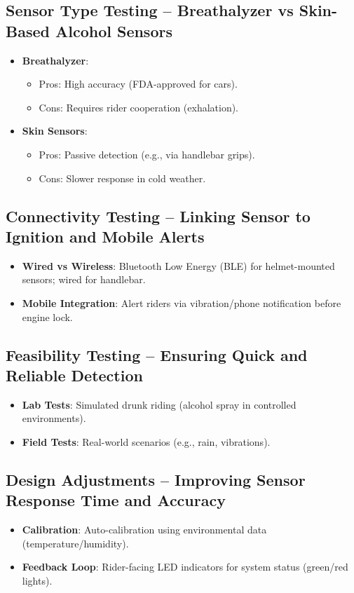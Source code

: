 \documentclass{article}
\begin{document}
\subsection{Sensor Type Testing -- Breathalyzer vs Skin-Based Alcohol Sensors}
\begin{itemize}
    \item \textbf{Breathalyzer}: 
    \begin{itemize}
        \item Pros: High accuracy (FDA-approved for cars).
        \item Cons: Requires rider cooperation (exhalation).
    \end{itemize}
    \item \textbf{Skin Sensors}: 
    \begin{itemize}
        \item Pros: Passive detection (e.g., via handlebar grips).
        \item Cons: Slower response in cold weather.
    \end{itemize}
\end{itemize}

\subsection{Connectivity Testing -- Linking Sensor to Ignition and Mobile Alerts}
\begin{itemize}
    \item \textbf{Wired vs Wireless}: Bluetooth Low Energy (BLE) for helmet-mounted sensors; wired for handlebar.
    \item \textbf{Mobile Integration}: Alert riders via vibration/phone notification before engine lock.
\end{itemize}

\subsection{Feasibility Testing -- Ensuring Quick and Reliable Detection}
\begin{itemize}
    \item \textbf{Lab Tests}: Simulated drunk riding (alcohol spray in controlled environments).
    \item \textbf{Field Tests}: Real-world scenarios (e.g., rain, vibrations).
\end{itemize}

\subsection{Design Adjustments -- Improving Sensor Response Time and Accuracy}
\begin{itemize}
    \item \textbf{Calibration}: Auto-calibration using environmental data (temperature/humidity).
    \item \textbf{Feedback Loop}: Rider-facing LED indicators for system status (green/red lights).
\end{itemize}
\end{document}
